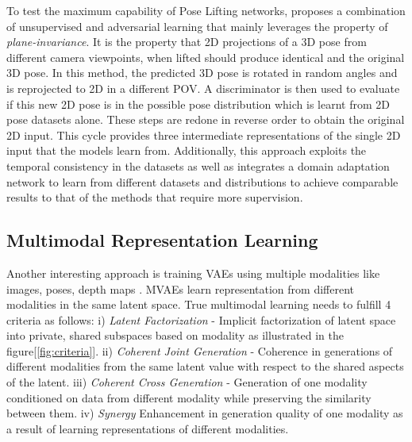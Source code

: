To test the maximum capability of Pose Lifting networks, \cite{amazon1} proposes a combination of unsupervised and adversarial learning that mainly leverages the property of \textit{plane-invariance}. It is the property that 2D projections of a 3D pose from different camera viewpoints, when lifted should produce identical and the original 3D pose. In this method, the predicted 3D pose is rotated in random angles and is reprojected to 2D in a different \ac{POV}. A discriminator is then used to evaluate if this new 2D pose is in the possible pose distribution which is learnt from 2D pose datasets alone. These steps are redone in reverse order to obtain the original 2D input. This cycle provides three intermediate representations of the single 2D input that the models learn from. Additionally, this approach exploits the temporal consistency in the datasets as well as integrates a domain adaptation network to learn from different datasets and distributions to achieve comparable results to that of the methods that require more supervision.


\subsection{Multimodal Representation Learning}
\label{section:multimodal_representation_learning}
Another interesting approach is training \ac{VAE}s using multiple modalities like images, poses, depth maps \cite{CrossingNets, crossmodal, MMVAE,HandDisentangled}. \ac{MVAE}s learn representation from different modalities in the same latent space. True multimodal learning needs to fulfill 4 criteria as follows: i) \textit{Latent Factorization} - Implicit factorization of latent space into private, shared subspaces based on modality as illustrated in the figure[\ref{fig:criteria}]. ii) \textit{Coherent Joint Generation} - Coherence in generations of different modalities from the same latent value with respect to the shared aspects of the latent. iii) \textit{Coherent Cross Generation} - Generation of one modality conditioned on data from different modality while preserving the similarity between them. iv) \textit{Synergy} Enhancement in generation quality of one modality as a result of learning representations of different modalities.

